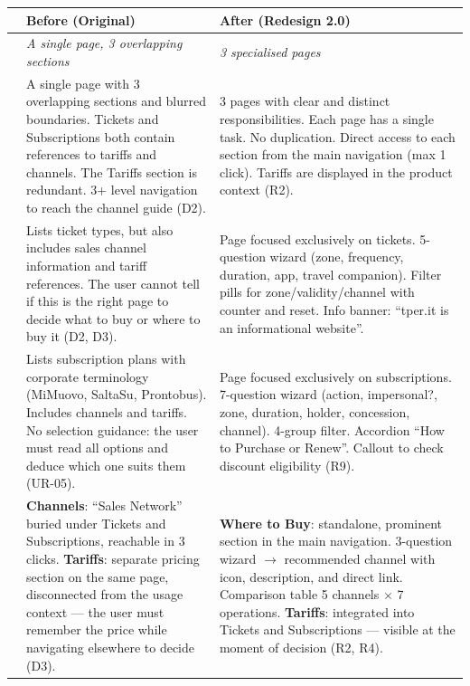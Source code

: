 \begin{table}[H]
\centering
\small
\renewcommand{\arraystretch}{1.4}
\begin{tabular}{|p{0.5cm}|p{7cm}|p{7cm}|}
\hline
& \textbf{Before (Original)} & \textbf{After (Redesign 2.0)} \\ \hline
\cellcolor{primaryColor!15} &
\textit{A single page, 3 overlapping sections} &
\textit{3 specialised pages} \\ \hline

\raisebox{0.5cm}{\rotatebox{90}{\textbf{Structure}}} &
A single page with 3 overlapping sections and blurred boundaries. Tickets and Subscriptions both contain references to tariffs and channels. The Tariffs section is redundant. 3+ level navigation to reach the channel guide (D2). &
3 pages with clear and distinct responsibilities. Each page has a single task. No duplication. Direct access to each section from the main navigation (max 1 click). Tariffs are displayed in the product context (R2). \\ \hline

\raisebox{0.5cm}{\rotatebox{90}{\textbf{Tickets}}} &
Lists ticket types, but also includes sales channel information and tariff references. The user cannot tell if this is the right page to decide what to buy or where to buy it (D2, D3). &
Page focused exclusively on tickets. 5-question wizard (zone, frequency, duration, app, travel companion). Filter pills for zone/validity/channel with counter and reset. Info banner: ``tper.it is an informational website''. \\ \hline

\raisebox{0.5cm}{\rotatebox{90}{\textbf{Subscriptions}}} &
Lists subscription plans with corporate terminology (MiMuovo, SaltaSu, Prontobus). Includes channels and tariffs. No selection guidance: the user must read all options and deduce which one suits them (UR-05). &
Page focused exclusively on subscriptions. 7-question wizard (action, impersonal?, zone, duration, holder, concession, channel). 4-group filter. Accordion ``How to Purchase or Renew''. Callout to check discount eligibility (R9). \\ \hline

\raisebox{0.5cm}{\rotatebox{90}{\textbf{Channels / Tariffs}}} &
\textbf{Channels}: ``Sales Network'' buried under Tickets and Subscriptions, reachable in 3 clicks. \textbf{Tariffs}: separate pricing section on the same page, disconnected from the usage context --- the user must remember the price while navigating elsewhere to decide (D3). &
\textbf{Where to Buy}: standalone, prominent section in the main navigation. 3-question wizard $\rightarrow$ recommended channel with icon, description, and direct link. Comparison table 5 channels $\times$ 7 operations. \textbf{Tariffs}: integrated into Tickets and Subscriptions --- visible at the moment of decision (R2, R4). \\ \hline


\end{tabular}
\end{table}
